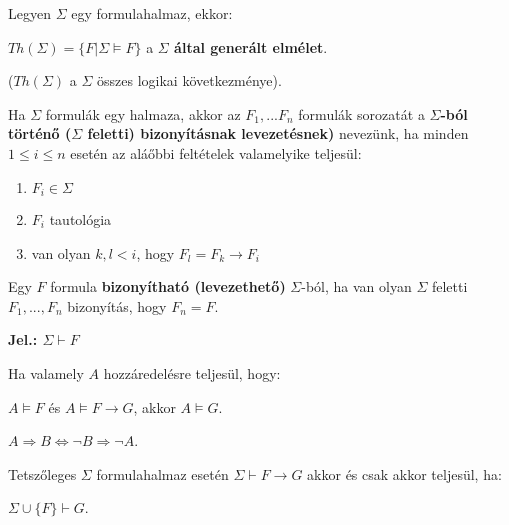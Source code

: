 \documentclass[10pt]{article}
\renewcommand{\\}{\par\noindent}
\begin{document}
\begin{frame}

\begin{tcolorbox}[title={Def.: Elmélet}]
Legyen $\Sigma$ egy formulahalmaz, ekkor:\\
\smallskip
$Th({\Sigma}) = \{F | \Sigma \models F\}$ a \textbf{$\Sigma$ által generált elmélet}.\\
($Th({\Sigma})$ a $\Sigma$ összes logikai következménye).
\end{tcolorbox}

\begin{tcolorbox}[title={Def.: Levezetés, bizonyítható formula}]
Ha $\Sigma$ formulák egy halmaza, akkor az $F_1, ... F_n$ formulák sorozatát a \textbf{$\Sigma$-ból történő ($\Sigma$ feletti) bizonyításnak levezetésnek)} nevezünk, ha minden $1 \leq i \leq n$ esetén az aláőbbi feltételek valamelyike teljesül:\\
\begin{enumerate}
\item $F_i \in \Sigma$
\item $F_i$ tautológia
\item van olyan $k, l < i$, hogy $F_l = F_k \rightarrow F_i$
\end{enumerate}
\bigskip
Egy $F$ formula \textbf{bizonyítható (levezethető)} $\Sigma$-ból, ha van olyan $\Sigma$ feletti $F_1, ..., F_n$ bizonyítás, hogy $F_n = F$.\\
\bigskip
\textbf{Jel.: $\Sigma \vdash F$}
\end{tcolorbox}

\end{frame}

\begin{frame}

\begin{tcolorbox}[title={Def.: Modus Ponens}]
Ha valamely $A$ hozzáredelésre teljesül, hogy:\\
$A \models F$ és $A \models F \rightarrow G$, akkor $A \models G$.
\end{tcolorbox}

\begin{tcolorbox}[title={Def.: Modus Tollens (Kontrapozíció)}]
$A \Rightarrow B \iff {\neg}B \Rightarrow {\neg}A$.
\end{tcolorbox}

\begin{tcolorbox}[title={Def.: Indirekt Bizonyítás}]
Tetszőleges $\Sigma$ formulahalmaz esetén $\Sigma \vdash F \rightarrow G$ akkor és csak akkor teljesül, ha:\\
$\Sigma \cup \{F\} \vdash G$.
\end{tcolorbox}

\end{frame}
\end{document}
